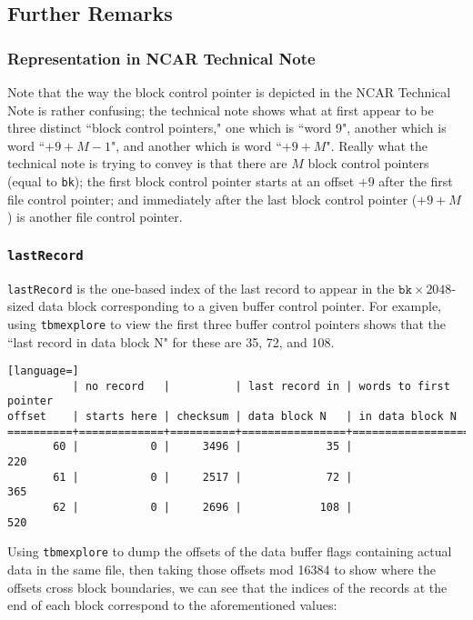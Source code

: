 \documentclass{report}
\begin{document}
\subsection{Further Remarks}

\subsubsection{Representation in NCAR Technical Note}

Note that the way the block control pointer is depicted in the NCAR Technical Note is rather confusing; the technical note shows what at first appear to be three distinct ``block control pointers," one which is ``word 9", another which is word ``\(+9+M-1\)", and another which is word ``\(+9+M\)". Really what the technical note is trying to convey is that there are \(M\) block control pointers (equal to \texttt{bk}); the first block control pointer starts at an offset \(+9\) after the first file control pointer; and immediately after the last block control pointer (\(+9+M\)) is another file control pointer.

\subsubsection{\texttt{lastRecord}}

\texttt{lastRecord} is the one-based index of the last record to appear in the \(\mathtt{bk} \times 2048\)-sized data block corresponding to a given buffer control pointer. For example, using \texttt{tbmexplore} to view the first three buffer control pointers shows that the ``last record in data block N" for these are 35, 72, and 108.

\begin{lstlisting}[language=]
          | no record   |          | last record in | words to first pointer
offset    | starts here | checksum | data block N   | in data block N
==========+=============+==========+================+========================
       60 |           0 |     3496 |             35 |                    220
       61 |           0 |     2517 |             72 |                    365
       62 |           0 |     2696 |            108 |                    520

\end{lstlisting}

Using \texttt{tbmexplore} to dump the offsets of the data buffer flags containing actual data in the same file, then taking those offsets mod 16384 to show where the offsets cross block boundaries, we can see that the indices of the records at the end of each block correspond to the aforementioned values:
\end{document}

